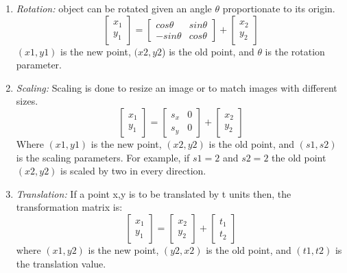 \noindent\begin{enumerate}
    \item \textit{Rotation:}  object can be rotated given an angle $\theta$ proportionate to its origin.  \begin{equation} \begin{bmatrix} x_{1} \\ y_{1} \end{bmatrix} = \begin{bmatrix} cos\theta & sin\theta \\ -sin\theta & cos\theta \end{bmatrix} + \begin{bmatrix} x_{2} \\ y_{2} \end{bmatrix} \end{equation} $(x1, y1)$ is the new point, $(x2, y2$) is the old point, and $\theta$ is the rotation parameter. \\
    \item \textit{Scaling:} Scaling is done to resize an image or to match images with different sizes.  \begin{equation} \begin{bmatrix} x_{1} \\ y_{1} \end{bmatrix} = \begin{bmatrix} s_{x} & 0 \\ s_{y} & 0 \end{bmatrix} + \begin{bmatrix} x_{2} \\ y_{2} \end{bmatrix} \end{equation} Where $(x1, y1)$ is the new point, $(x2, y2)$ is the old point, and $(s1, s2)$ is the scaling parameters. For example, if $s1 = 2$ and $s2 = 2$ the old point $(x2, y2)$ is scaled by two in every direction. \\
    \item \textit{Translation:} If a point x,y  is to be translated by t units then, the transformation matrix is: \begin{equation} \begin{bmatrix} x_{1} \\ y_{1} \end{bmatrix} = \begin{bmatrix} x_{2} \\ y_{2} \end{bmatrix} + \begin{bmatrix} t_{1} \\ t_{2} \end{bmatrix} \end{equation} where $(x1, y2)$ is the new point, $(y2, x2)$ is the old point, and $(t1, t2)$ is the translation value. \\

\end{enumerate}
